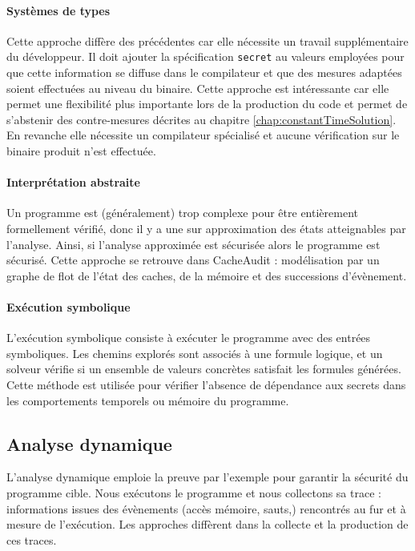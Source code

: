 \paragraph{Systèmes de types} Cette approche diffère des précédentes car elle nécessite un travail supplémentaire du développeur. Il doit ajouter la spécification \texttt{secret} au valeurs employées pour que cette information se diffuse dans le compilateur et que des mesures adaptées soient effectuées au niveau du binaire. Cette approche est intéressante car elle permet une flexibilité plus importante lors de la production du code et permet de s'abstenir des contre-mesures décrites au chapitre \ref{chap:constantTimeSolution}. En revanche elle nécessite un compilateur spécialisé et aucune vérification sur le binaire produit n'est effectuée. 

\paragraph{Interprétation abstraite} Un programme est (généralement) trop complexe pour être entièrement formellement vérifié, donc il y a une sur approximation des états atteignables par l'analyse. Ainsi, si l'analyse approximée est sécurisée alors le programme est sécurisé. Cette approche se retrouve dans CacheAudit \cite{CacheAudit} : modélisation par un graphe de flot de l'état des caches, de la mémoire et des successions d'évènement.

\paragraph{Exécution symbolique} L'exécution symbolique consiste à exécuter le programme avec des entrées symboliques. Les chemins explorés sont associés à une formule logique, et un solveur vérifie si un ensemble de valeurs concrètes satisfait les formules générées. Cette méthode est utilisée pour vérifier l'absence de dépendance aux secrets dans les comportements temporels ou mémoire du programme.

\subsection*{Analyse dynamique}

L'analyse dynamique emploie la preuve par l'exemple pour garantir la sécurité du programme cible. Nous exécutons le programme et nous collectons sa trace : informations issues des évènements (accès mémoire, sauts,\etc) rencontrés au fur et à mesure de l'exécution. Les approches diffèrent dans la collecte et la production de ces traces.

